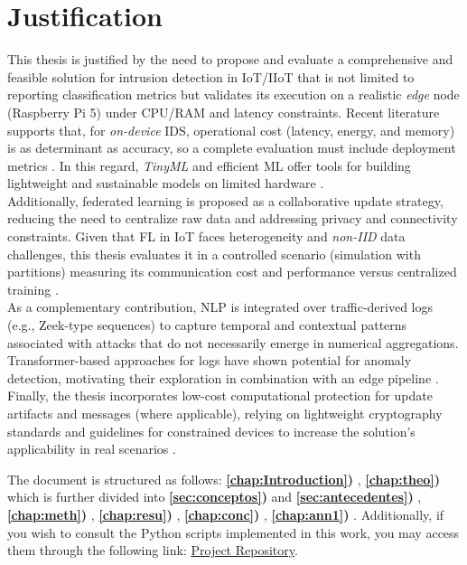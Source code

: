 \section{Justification}

This thesis is justified by the need to propose and evaluate a comprehensive and feasible solution for intrusion detection in IoT/IIoT that is not limited to reporting classification metrics but validates its execution on a realistic \textit{edge} node (Raspberry Pi 5) under CPU/RAM and latency constraints. Recent literature supports that, for \textit{on-device} IDS, operational cost (latency, energy, and memory) is as determinant as accuracy, so a complete evaluation must include deployment metrics \cite{Tekin2023_OnDeviceEnergy}. In this regard, \textit{TinyML} and efficient ML offer tools for building lightweight and sustainable models on limited hardware \cite{DuttaBharali2021_TinyMLSurvey}.\\
\newline
Additionally, federated learning is proposed as a collaborative update strategy, reducing the need to centralize raw data and addressing privacy and connectivity constraints. Given that FL in IoT faces heterogeneity and \textit{non-IID} data challenges, this thesis evaluates it in a controlled scenario (simulation with partitions) measuring its communication cost and performance versus centralized training \cite{Imteaj2022_FL_ResourceConstrainedSurvey, Roy2023_FL_AdaptedModel}.\\
\newline
As a complementary contribution, NLP is integrated over traffic-derived logs (e.g., Zeek-type sequences) to capture temporal and contextual patterns associated with attacks that do not necessarily emerge in numerical aggregations. Transformer-based approaches for logs have shown potential for anomaly detection, motivating their exploration in combination with an edge pipeline \cite{LogBERT2021, LTAnomaly2023, Yadav2023_LLM_Zeek}.\\
\newline
Finally, the thesis incorporates low-cost computational protection for update artifacts and messages (where applicable), relying on lightweight cryptography standards and guidelines for constrained devices to increase the solution's applicability in real scenarios \cite{NIST_SP800232_2025}.\\
\newline

The document is structured as follows: \textbf{\ref{chap:Introduction})} , \textbf{\ref{chap:theo})}  which is further divided into \textbf{\ref{sec:conceptos})}  and \textbf{\ref{sec:antecedentes})} , \textbf{\ref{chap:meth})} , \textbf{\ref{chap:resu})} , \textbf{\ref{chap:conc})} , \textbf{\ref{chap:ann1})} . Additionally, if you wish to consult the Python scripts implemented in this work, you may access them through the following link: \href{https://github.com/}{Project Repository}.
\newline
\newline

